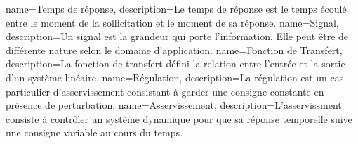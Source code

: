 %
{%
  name={Temps de réponse},%
  description={Le temps de réponse est le temps écoulé entre le moment de 
  la sollicitation et le moment de sa réponse.
  }
}
%
{%
  name={Signal},%
  description={Un signal est la grandeur qui porte l'information. Elle peut être
  de différente nature selon le domaine d'application.
  }
}
%
{%
  name={Fonction de Transfert},%
  description={La fonction de transfert défini la relation
  entre l'entrée et la sortie d'un système linéaire.
  }
}
%
{%
  name={Régulation},%
  description={La régulation est un cas particulier d'asservissement 
  consistant à garder une consigne constante en présence de perturbation.}
}
%
{%
  name={Asservissement},%
  description={L'asservissment consiste à contrôler un système dynamique
  pour que sa réponse temporelle suive une consigne variable au cours du 
  temps.
  }
}
